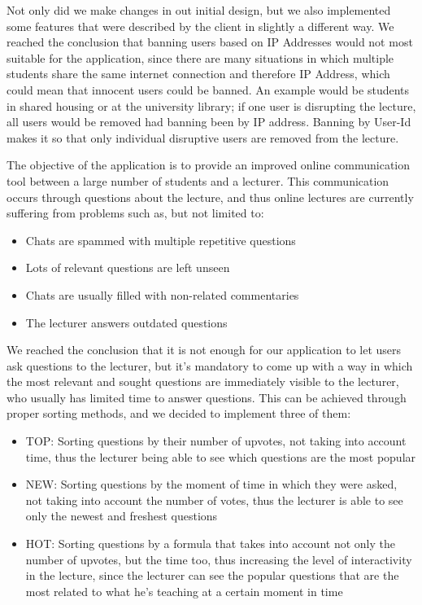 \documentclass{article}
\begin{document}
Not only did we make changes in out initial design, but we also implemented some features that were described by the client
in slightly a different way.
We reached the conclusion that banning users based on IP Addresses would not most suitable for the application,
since there are many situations in which multiple students share the same internet connection and therefore IP Address,
which could mean that innocent users could be banned.
An example would be students in shared housing or at the university library; if one user is disrupting the lecture,
all users would be removed had banning been by IP address. Banning by User-Id makes it so that only individual disruptive
users are removed from the lecture.

The objective of the application is to provide an improved online communication tool between a large number of students and a lecturer. This communication occurs through questions about the lecture, and thus online lectures are currently suffering from problems such as, but not limited to:
\begin{itemize}
\item Chats are spammed with multiple repetitive questions
\item Lots of relevant questions are left unseen
\item Chats are usually filled with non-related commentaries
\item The lecturer answers outdated questions
\end{itemize}

We reached the conclusion that it is not enough for our application to let users ask questions to the lecturer, but it's mandatory to come up with a way in which the most relevant and sought questions are immediately visible to the lecturer, who usually has limited time to answer questions.
This can be achieved through proper sorting methods, and we decided to implement three of them:
\begin{itemize}
    \item TOP: Sorting questions by their number of upvotes, not taking into account time, thus the lecturer being able to see which questions are the most popular
    \item NEW: Sorting questions by the moment of time in which they were asked, not taking into account the number of votes, thus the lecturer is able to see only the newest and freshest questions
    \item HOT: Sorting questions by a formula that takes into account not only the number of upvotes, but the time too, thus increasing the level of interactivity in the lecture, since the lecturer can see the popular questions that are the most related to what he's teaching at a certain moment in time
\end{itemize}
\end{document}
